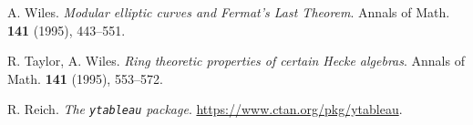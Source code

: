 \documentclass{article}
\begin{document}
\begin{thebibliography}{9}


  A. Wiles. \emph{Modular elliptic curves and Fermat's Last Theorem}. Annals of Math. \textbf{141} (1995), 443--551.
  
  R. Taylor, A. Wiles. \emph{Ring theoretic properties of certain Hecke algebras}. Annals of Math. \textbf{141} (1995), 553--572.
  
  R. Reich. \emph{The \texttt{ytableau} package}. \url{https://www.ctan.org/pkg/ytableau}.
\end{thebibliography}

\end{document}

